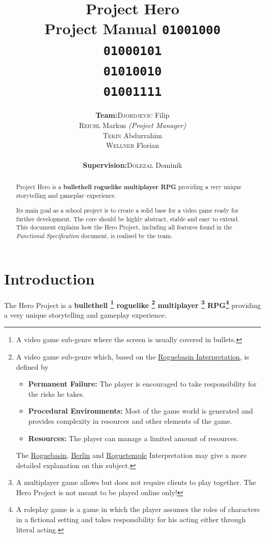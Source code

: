 \documentclass[11pt]{article}
\title{
  \textbf{Project Hero}\\
  \large{Project Manual}
  \linebreak
  \linebreak
  \small{\texttt{01001000\\01000101\\01010010\\01001111}}
}
\author{
  \begin{tabular}{rl}
    \textbf{Team:}
    & \textsc{Djordjevic} Filip\\
    & \textsc{Reichl} Markus \small{\textit{(Project Manager)}}\\
    & \textsc{Tekin} Abdurrahim\\
    & \textsc{Wellner} Florian\\
    \\
    \textbf{Supervision:}
    & \textsc{Dolezal} Dominik
  \end{tabular}
}
\begin{document}
\begin{titlepage}
  \clearpage
  \maketitle
  \thispagestyle{empty}
  
  \begin{abstract}
    \begin{flushleft}
      Project Hero is a \textbf{bullethell roguelike multiplayer RPG} providing a very unique storytelling and gameplay experience.
      
      Its main goal as a school project is to create a solid base for a video game ready for further development. The core should be highly abstract, stable and easy to extend.
      \linebreak
      \linebreak
      This document explains how the Hero Project, including all features found in the \textit{Functional Specification} document, is realised by the team.
     \end{flushleft}
  \end{abstract}
\end{titlepage}

\tableofcontents
\newpage

\section{Introduction}
The Hero Project is a \textbf{
  bullethell
  \footnote{A video game sub-genre where the screen is usually covered in bullets.}
  roguelike
  \footnote{A video game sub-genre which, based on the \href{http://roguebasin.com/roguelike-definition}{Roguebasin Interpretation}, is defined by 
    \begin{itemize}
      \item \textbf{Permanent Failure:} The player is encouraged to take responsibility for the risks he takes.
      \item \textbf{Procedural Environments:} Most of the game world is generated and provides complexity in resources and other elements of the game.
      \item \textbf{Resources:} The player can manage a limited amount of resources.
    \end{itemize}
    The \href{http://roguebasin.com/roguelike-definition}{Roguebasin}, \href{http://roguebasin.com/index.php?title=Berlin_Interpretation}{Berlin} and \href{http://roguetemple.com/roguelike-definition}{Roguetemple} Interpretation may give a more detailed explanation on this subject.
  }
  multiplayer
  \footnote{A multiplayer game allows but does not require clients to play together. The Hero Project is not meant to be played online only!}
  RPG\footnote{A roleplay game is a game in which the player assumes the roles of characters in a fictional setting and takes responsibility for his acting either through literal acting.}
} providing a very unique storytelling and gameplay experience.
\end{document}
